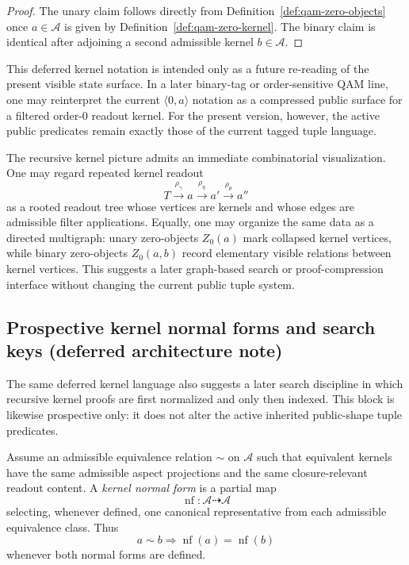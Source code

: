 \begin{proof}
The unary claim follows directly from Definition~\ref{def:qam-zero-objects} once $a\in\mathcal A$ is given by Definition~\ref{def:qam-zero-kernel}. The binary claim is identical after adjoining a second admissible kernel $b\in\mathcal A$.
\end{proof}

\begin{remark}\label{rem:qam-zero-compressed}
This deferred kernel notation is intended only as a future re-reading of the present visible state surface. In a later binary-tag or order-sensitive QAM line, one may reinterpret the current $\langle 0,a\rangle$ notation as a compressed public surface for a filtered order-$0$ readout kernel. For the present version, however, the active public predicates remain exactly those of the current tagged tuple language.
\end{remark}

\begin{remark}\label{rem:qam-zero-graph}
The recursive kernel picture admits an immediate combinatorial visualization. One may regard repeated kernel readout
\[
T \xrightarrow{\rho_\gamma} a \xrightarrow{\rho_\eta} a' \xrightarrow{\rho_\theta} a''
\]
as a rooted readout tree whose vertices are kernels and whose edges are admissible filter applications. Equally, one may organize the same data as a directed multigraph: unary zero-objects $Z_0(a)$ mark collapsed kernel vertices, while binary zero-objects $Z_0(a,b)$ record elementary visible relations between kernel vertices. This suggests a later graph-based search or proof-compression interface without changing the current public tuple system.
\end{remark}


\subsection*{Prospective kernel normal forms and search keys (deferred architecture note)}

The same deferred kernel language also suggests a later search discipline in which recursive kernel proofs are first normalized and only then indexed. This block is likewise prospective only: it does not alter the active inherited public-shape tuple predicates.

\begin{definition}\label{def:qam-kernel-normal-form}
Assume an admissible equivalence relation $\sim$ on $\mathcal A$ such that equivalent kernels have the same admissible aspect projections and the same closure-relevant readout content. A \emph{kernel normal form} is a partial map
\[
\operatorname{nf}:\mathcal A \dashrightarrow \mathcal A
\]
selecting, whenever defined, one canonical representative from each admissible equivalence class. Thus
\[
a\sim b \Longrightarrow \operatorname{nf}(a)=\operatorname{nf}(b)
\]
whenever both normal forms are defined.
\end{definition}

